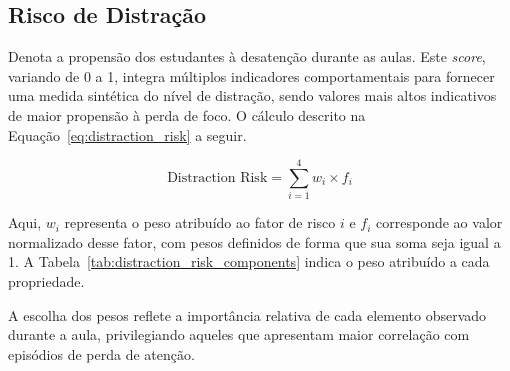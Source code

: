 \subsection{Risco de Distração}
Denota a propensão dos estudantes à desatenção durante as aulas. Este \textit{score}, variando de 0 a 1, integra múltiplos indicadores comportamentais para fornecer uma medida sintética do nível de distração, sendo valores mais altos indicativos de maior propensão à perda de foco. O cálculo descrito na Equação~\ref{eq:distraction_risk} a seguir.

\begin{equation}
\label{eq:distraction_risk}
\text{Distraction Risk} = \sum_{i=1}^{4} w_i \times f_i
\end{equation}

Aqui, $w_i$ representa o peso atribuído ao fator de risco $i$ e $f_i$ corresponde ao valor normalizado desse fator, com pesos definidos de forma que sua soma seja igual a 1. A Tabela~\ref{tab:distraction_risk_components} indica o peso atribuído a cada propriedade.



A escolha dos pesos reflete a importância relativa de cada elemento observado durante a aula, privilegiando aqueles que apresentam maior correlação com episódios de perda de atenção. 

% 



